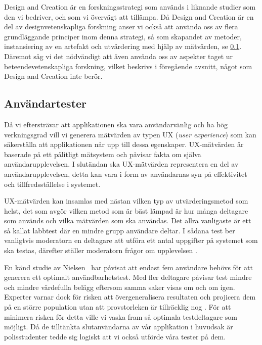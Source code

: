 \documentclass[swedish]{maucsthesis}
\begin{document}
Design and Creation \cite{saltuk:2014} är en forskningsstrategi som används i liknande studier som den vi bedriver, och som vi övervägt att tillämpa. Då Design and Creation är en del av designvetenskapliga forskning anser vi också att använda oss av flera grundläggande principer inom denna strategi, så som skapandet av metoder, instansiering av en artefakt och utvärdering med hjälp av mätvärden, se \cref{användartester}. Däremot såg vi det nödvändigt att även använda oss av aspekter taget ur beteendevetenskapliga forskning, vilket beskrivs i föregående avsnitt, något som Design and Creation inte berör.


\subsection{Användartester}\label{användartester}

Då vi eftersträvar att applikationen ska vara användarvänlig och ha hög verkningsgrad vill vi
generera mätvärden av typen UX (\textit {user experience}) som  kan säkerställa
att applikationen når upp till dessa egenskaper. UX-mätvärden är baserade på ett
pålitligt mätsystem och påvisar fakta om själva användarupplevelsen. I slutändan
ska UX-mätvärden representera en del av användarupplevelsen, detta kan vara i
form av användarnas syn på effektivitet och tillfredsställelse i systemet.

UX-mätvärden kan insamlas med nästan vilken typ av utvärderingsmetod som helst,
det som avgör vilken metod som är bäst lämpad är hur många deltagare som används
och vilka mätvärden som ska användas. Det allra vanligaste är ett så kallat
labbtest där en mindre grupp användare deltar. I sådana test ber vanligtvis
moderatorn en deltagare att utföra ett antal uppgifter på systemet som ska
testas, därefter ställer moderatorn frågor om upplevelsen \cite{tullis:2013}.

En känd studie av Nielsen~\cite{nielsen:2000} har påvisat att endast fem användare
behövs för att generera ett optimalt användbarhetstest. Med fler deltagare
påvisar test mindre och mindre värdefulla belägg eftersom samma saker visas om
och om igen. Experter varnar dock för risken att övergeneralisera resultaten och
projicera dem på en större population utan att provstorleken är tillräcklig nog
\cite{tullis:2013}. För att minimera risken för detta ville vi vaska fram så
optimala testdeltagare som möjligt. Då de tilltänkta slutanvändarna av vår
applikation i huvudsak är polisstudenter tedde sig logiskt att vi också
utförde våra tester på dem.
\end{document}
